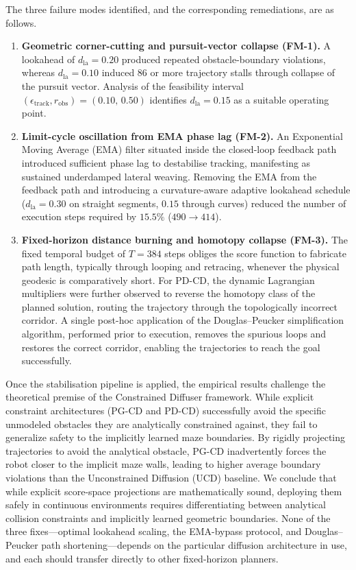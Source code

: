\documentclass[12pt, a4paper, oneside]{report}
\theoremstyle{definition}
\newcommand{\dlookahead}{d_{\mathrm{la}}}
\begin{document}
The three failure modes identified, and the corresponding
remediations, are as follows.
\begin{enumerate}[leftmargin=*, itemsep=3pt]
  \item \textbf{Geometric corner-cutting and pursuit-vector collapse
        (FM-1).} A lookahead of $\dlookahead{=}0.20$ produced
        repeated obstacle-boundary violations, whereas
        $\dlookahead{=}0.10$ induced 86 or more trajectory stalls
        through collapse of the pursuit vector. Analysis of the
        feasibility interval $(\epsilon_{\mathrm{track}},
        r_{\mathrm{obs}}) = (0.10,\,0.50)$ identifies
        $\dlookahead = 0.15$ as a suitable operating point.
  \item \textbf{Limit-cycle oscillation from EMA phase lag (FM-2).}
        An Exponential Moving Average (EMA) filter situated inside
        the closed-loop feedback path introduced sufficient phase
        lag to destabilise tracking, manifesting as sustained
        underdamped lateral weaving. Removing the EMA from the
        feedback path and introducing a curvature-aware adaptive
        lookahead schedule ($\dlookahead{=}0.30$ on straight
        segments, $0.15$ through curves) reduced the number of
        execution steps required by $15.5\%$
        ($490 \to 414$).
  \item \textbf{Fixed-horizon distance burning and homotopy
        collapse (FM-3).} The fixed temporal budget of $T{=}384$
        steps obliges the score function to fabricate path length,
        typically through looping and retracing, whenever the
        physical geodesic is comparatively short. For PD-CD, the
        dynamic Lagrangian multipliers were further observed to
        reverse the homotopy class of the planned solution,
        routing the trajectory through the topologically incorrect
        corridor. A single post-hoc application of the
        Douglas--Peucker simplification algorithm, performed prior
        to execution, removes the spurious loops and restores the
        correct corridor, enabling the trajectories to reach the goal successfully.
\end{enumerate}

Once the stabilisation pipeline is applied, the empirical results challenge the theoretical
premise of the Constrained Diffuser framework. While explicit constraint architectures
(PG-CD and PD-CD) successfully avoid the specific unmodeled obstacles they are analytically
constrained against, they fail to generalize safety to the implicitly learned maze boundaries.
By rigidly projecting trajectories to avoid the analytical obstacle, PG-CD inadvertently
forces the robot closer to the implicit maze walls, leading to higher average boundary violations
than the Unconstrained Diffusion (UCD) baseline. We conclude that while explicit score-space
projections are mathematically sound, deploying them safely in continuous environments requires
differentiating between analytical collision constraints and implicitly learned geometric boundaries.
None of the three fixes---optimal lookahead scaling, the EMA-bypass protocol, and
Douglas--Peucker path shortening---depends on the particular diffusion architecture in use,
and each should transfer directly to other fixed-horizon planners.
\end{document}
